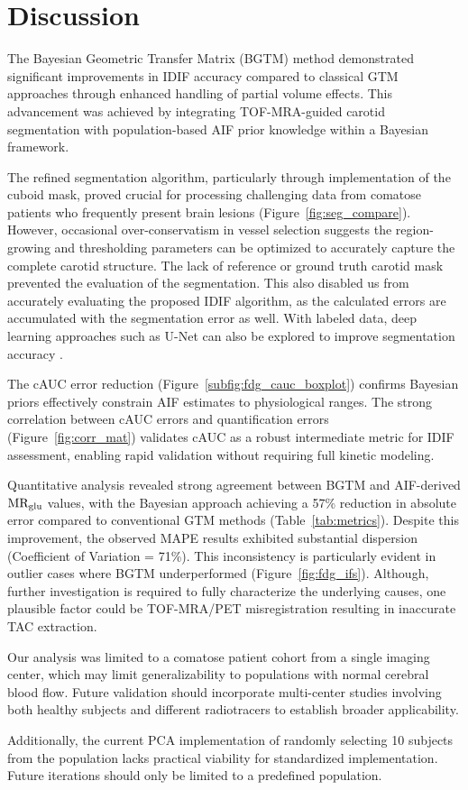 \chapter{Discussion}
The Bayesian Geometric Transfer Matrix (BGTM) method demonstrated significant improvements in IDIF accuracy compared to classical GTM approaches through enhanced handling of partial volume effects.
This advancement was achieved by integrating TOF-MRA-guided carotid segmentation with population-based AIF prior knowledge within a Bayesian framework.

The refined segmentation algorithm, particularly through implementation of the cuboid mask, proved crucial for processing challenging data from comatose patients who frequently present brain lesions (Figure~\ref{fig:seg_compare}).
However, occasional over-conservatism in vessel selection suggests the region-growing and thresholding parameters can be optimized to accurately capture the complete carotid structure.
The lack of reference or ground truth carotid mask prevented the evaluation of the segmentation.
This also disabled us from accurately evaluating the proposed IDIF algorithm, as the calculated errors are accumulated with the segmentation error as well.
With labeled data, deep learning approaches such as U-Net can also be explored to improve segmentation accuracy \cite{ronneberger2015u}.


The cAUC error reduction (Figure~\ref{subfig:fdg_cauc_boxplot}) confirms Bayesian priors effectively constrain AIF estimates to physiological ranges.
The strong correlation between cAUC errors and quantification errors (Figure~\ref{fig:corr_mat}) validates cAUC as a robust intermediate metric for IDIF assessment, enabling rapid validation without requiring full kinetic modeling.

Quantitative analysis revealed strong agreement between BGTM and AIF-derived $\text{MR}_{\text{glu}}$ values, with the Bayesian approach achieving a 57\% reduction in absolute error compared to conventional GTM methods (Table~\ref{tab:metrics}).
Despite this improvement, the observed MAPE results exhibited substantial dispersion (Coefficient of Variation = 71\%).
This inconsistency is particularly evident in outlier cases where BGTM underperformed (Figure~\ref{fig:fdg_ifs}).
Although, further investigation is required to fully characterize the underlying causes, one plausible factor could be TOF-MRA/PET misregistration resulting in inaccurate TAC extraction.


Our analysis was limited to a comatose patient cohort from a single imaging center, which may limit generalizability to populations with normal cerebral blood flow.
Future validation should incorporate multi-center studies involving both healthy subjects and different radiotracers to establish broader applicability.

Additionally, the current PCA implementation of randomly selecting 10 subjects from the population lacks practical viability for standardized implementation.
Future iterations should only be limited to a predefined population.
